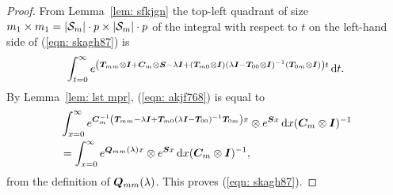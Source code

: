 \begin{proof}
	From Lemma~\ref{lem: sfkjgn} the top-left quadrant of size \(m_1\times m_1=|\mathcal{S}_m|\cdot p \times |\mathcal{S}_m|\cdot p\) of the integral with respect to \(t\) on the left-hand side of (\ref{eqn: skagh87}) is 
	\begin{align}
		\int_{t=0}^\infty e^{\left(\boldsymbol T_{mm}\otimes \boldsymbol I + \boldsymbol C_m\otimes \boldsymbol S - \lambda \boldsymbol I+ (\boldsymbol T_{m0}\otimes \boldsymbol I)(\lambda \boldsymbol I-\boldsymbol T_{00}\otimes \boldsymbol I)^{-1}(\boldsymbol T_{0m}\otimes \boldsymbol I)\right)t}\, \mathrm{d} t. \label{eqn: akjf768}
	\end{align}
	By Lemma~\ref{lem: lst mpr}, (\ref{eqn: akjf768}) is equal to 
	\begin{align}
		&\int_{x=0}^\infty e^{\boldsymbol C_m^{-1}\left(\boldsymbol T_{mm} - \lambda \boldsymbol I+ \boldsymbol T_{m0} (\lambda \boldsymbol I-\boldsymbol T_{00})^{-1}\boldsymbol T_{0m} \right)x}\otimes e^{\boldsymbol Sx}\, \mathrm{d} x(\boldsymbol C_m\otimes \boldsymbol I)^{-1}\nonumber
		\\&=\int_{x=0}^\infty e^{\boldsymbol Q_{mm} ( \lambda )x}\otimes e^{\boldsymbol Sx}\, \mathrm{d} x(\boldsymbol C_m\otimes \boldsymbol I)^{-1} , \label{eqn: akjf7623988}
	\end{align}
	from the definition of \(\boldsymbol Q_{mm}(\lambda)\). This proves (\ref{eqn: skagh87}). 
	

\end{proof}
